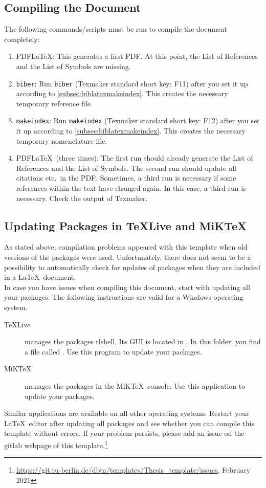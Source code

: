 \subsection{Compiling the Document}\label{subsec:compiling}
The following commands/scripts must be run to compile the document completely:
\begin{enumerate}
	\item PDF\LaTeX: This generates a first PDF. At this point, the List of References and the List of Symbols are missing.
	\item \verb+biber+: Run \verb+biber+ (Texmaker standard short key: F11) after you set it up according to \autoref{subsec:biblatexmakeindex}. This creates the necessary temporary reference file.
	\item \verb+makeindex+: Run \verb+makeindex+ (Texmaker standard short key: F12) after you set it up according to \autoref{subsec:biblatexmakeindex}. This creates the necessary temporary nomenclature file.
	\item PDF\LaTeX\ (three times): The first run should already generate the List of References and the List of Symbols. The second run should update all citations etc.\ in the PDF. Sometimes, a third run is necessary if some references within the text have changed again. In this case, a third run is necessary. Check the output of Texmaker.
\end{enumerate}
\subsection{Updating Packages in \TeX Live and MiK\TeX}\label{subsec:update_packages}
As stated above, compilation problems appeared with this template when old versions of the packages were used. Unfortunately, there does not seem to be a possibility to automatically check for updates of packages when they are included in a \LaTeX\ document.\\
In case you have issues when compiling this document, start with updating all your packages. The following instructions are valid for a Windows operating system.
\begin{description}
	\item[\TeX Live] manages the packages tlshell. Its GUI is located in . In this folder, you find a file called . Use this program to update your packages.
	\item[MiK\TeX] manages the packages in the MiK\TeX\ console. Use this application to update your packages.
\end{description}
Similar applications are available on all other operating systems. Restart your \LaTeX\ editor after updating all packages and see whether you can compile this template without errors. If your problem persists, please add an issue on the gitlab webpage of this template.\footnote{\url{https://git.tu-berlin.de/dbta/templates/Thesis_template/issues}, February 2021}
